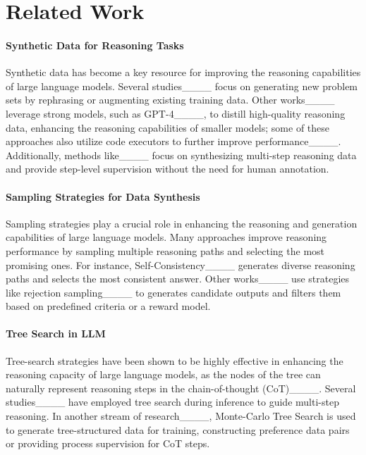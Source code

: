 \section{Related Work}
\paragraph{Synthetic Data for Reasoning Tasks}
Synthetic data has become a key resource for improving the reasoning capabilities of large language models. Several studies____ focus on generating new problem sets by rephrasing or augmenting existing training data. Other works____ leverage strong models, such as GPT-4____, to distill high-quality reasoning data, enhancing the reasoning capabilities of smaller models; some of these approaches also utilize code executors to further improve performance____. Additionally, methods like____ focus on synthesizing multi-step reasoning data and provide step-level supervision without the need for human annotation.

\paragraph{Sampling Strategies for Data Synthesis}

Sampling strategies play a crucial role in enhancing the reasoning and generation capabilities of large language models. Many approaches improve reasoning performance by sampling multiple reasoning paths and selecting the most promising ones. For instance, Self-Consistency____ generates diverse reasoning paths and selects the most consistent answer. Other works____ use strategies like rejection sampling____ to generates candidate outputs and filters them based on predefined criteria or a reward model. 

\paragraph{Tree Search in LLM}
Tree-search strategies have been shown to be highly effective in enhancing the reasoning capacity of large language models, as the nodes of the tree can naturally represent reasoning steps in the chain-of-thought (CoT)____. Several studies____ have employed tree search during inference to guide multi-step reasoning.
In another stream of research____, Monte-Carlo Tree Search is used to generate tree-structured data for training, constructing preference data pairs or providing process supervision for CoT steps.


